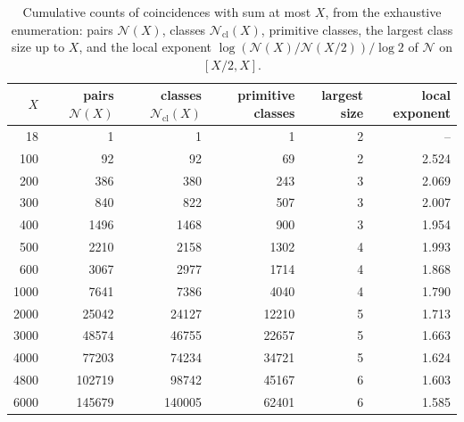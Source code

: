 \documentclass[10pt]{article}
\newcommand{\N}{\mathcal{N}}
\newcommand{\Ncl}{\mathcal{N}_{\mathrm{cl}}}
\begin{document}
\begin{table}[t]
\centering\small
\begin{tabular}{@{}rrrrrr@{}}
\toprule
$X$ & pairs $\N(X)$ & classes $\Ncl(X)$ & primitive classes & largest size & local exponent\\
\midrule
18 & 1 & 1 & 1 & 2 & -- \\
100 & 92 & 92 & 69 & 2 & 2.524 \\
200 & 386 & 380 & 243 & 3 & 2.069 \\
300 & 840 & 822 & 507 & 3 & 2.007 \\
400 & 1496 & 1468 & 900 & 3 & 1.954 \\
500 & 2210 & 2158 & 1302 & 4 & 1.993 \\
600 & 3067 & 2977 & 1714 & 4 & 1.868 \\
1000 & 7641 & 7386 & 4040 & 4 & 1.790 \\
2000 & 25042 & 24127 & 12210 & 5 & 1.713 \\
3000 & 48574 & 46755 & 22657 & 5 & 1.663 \\
4000 & 77203 & 74234 & 34721 & 5 & 1.624 \\
4800 & 102719 & 98742 & 45167 & 6 & 1.603 \\
6000 & 145679 & 140005 & 62401 & 6 & 1.585 \\
\bottomrule
\end{tabular}
\caption{Cumulative counts of coincidences with sum at most $X$, from the exhaustive enumeration: pairs $\N(X)$, classes $\Ncl(X)$, primitive classes, the largest class size up to $X$, and the local exponent $\log(\N(X)/\N(X/2))/\log2$ of $\N$ on $[X/2,X]$.}\label{tab:density}
\end{table}
\end{document}
